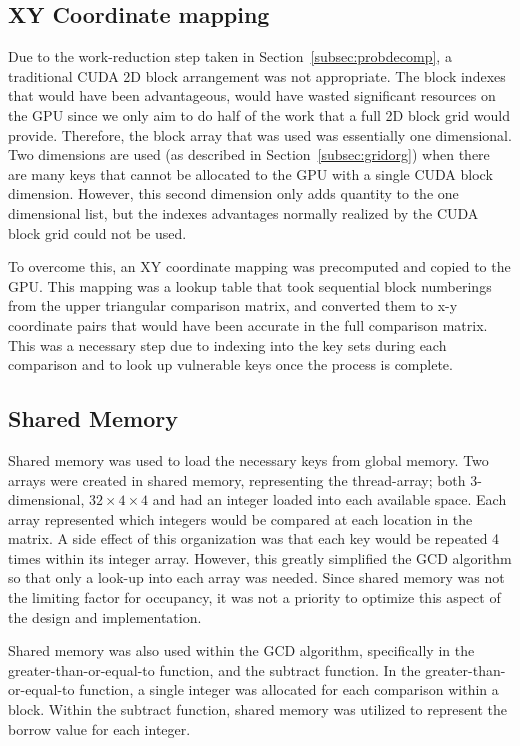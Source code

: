 \documentclass[12pt]{ucthesis}
\begin{document}
\subsection{XY Coordinate mapping}
\label{subsubsec:xymap}

Due to the work-reduction step taken in Section~\ref{subsec:probdecomp}, a
traditional CUDA 2D block arrangement was not appropriate. The block indexes
that would have been advantageous, would have wasted significant resources on
the GPU since we only aim to do half of the work that a full 2D block grid would
provide. Therefore, the block array that was used was essentially one
dimensional. Two dimensions are used (as described in
Section~\ref{subsec:gridorg}) when there are many keys that cannot be allocated
to the GPU with a single CUDA block dimension. However, this second dimension
only adds quantity to the one dimensional list, but the indexes advantages
normally realized by the CUDA block grid could not be used.

To overcome this, an XY coordinate mapping was precomputed and copied to the
GPU. This mapping was a lookup table that took sequential block numberings from
the upper triangular comparison matrix, and converted them to x-y coordinate
pairs that would have been accurate in the full comparison matrix. This was a
necessary step due to indexing into the key sets during each comparison and to
look up vulnerable keys once the process is complete.

\subsection{Shared Memory}
\label{subsec:shared}
Shared memory was used to load the necessary keys from global memory. Two 
arrays were created in shared memory, representing the thread-array; both 
3-dimensional, $32\times4\times4$ and had an integer loaded into each 
available space. Each array represented which integers would be compared at 
each location in the matrix. A side effect of this organization was that each key would be 
repeated 4 times within its integer array. However, this greatly simplified 
the GCD algorithm so that only a look-up into each array was needed. Since 
shared memory was not the limiting factor for occupancy, it was not a priority 
to optimize this aspect of the design and implementation. 

Shared memory was also used within the GCD algorithm, specifically in the 
greater-than-or-equal-to function, and the subtract function. In the 
greater-than-or-equal-to function, a single integer was allocated for each 
comparison within a block. Within the subtract function, shared memory was 
utilized to represent the borrow value for each integer. 
\end{document}
